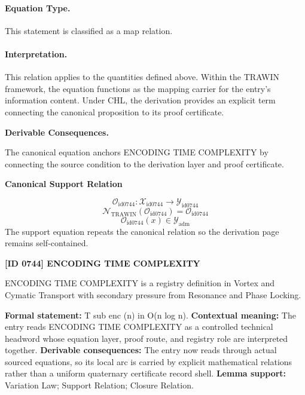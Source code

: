 \paragraph{Equation Type.}
This statement is classified as a map relation.

\paragraph{Interpretation.}
This relation applies to the quantities defined above. Within the TRAWIN framework, the equation functions as the mapping carrier for the entry’s information content. Under CHL, the derivation provides an explicit term connecting the canonical proposition to its proof certificate.

\par\vspace{0.35em}
\noindent\textbf{Derivable Consequences.}\quad
\begingroup
\footnotesize
\raggedright
The canonical equation anchors ENCODING TIME COMPLEXITY by connecting the source condition to the derivation layer and proof certificate.
\par\endgroup

\noindent\textbf{Canonical Support Relation}\par
\[
\mathcal{O}_{\mathrm{id0744}}:\mathcal{X}_{\mathrm{id0744}}\longrightarrow\mathcal{Y}_{\mathrm{id0744}}
\]
\[
\mathcal{N}_{\mathrm{TRAWIN}}(\mathcal{O}_{\mathrm{id0744}})=\mathcal{O}_{\mathrm{id0744}}
\]
\[
\mathcal{O}_{\mathrm{id0744}}(x)\in\mathcal{Y}_{\mathrm{adm}}
\]
\noindent The support equation repeats the canonical relation so the derivation page remains self-contained.\par

\clearpage
\noindent\textbf{[ID 0744] ENCODING TIME COMPLEXITY}\par
\vspace{0.35em}
\begingroup\small
{}
ENCODING TIME COMPLEXITY is a registry definition in Vortex and Cymatic Transport with secondary pressure from Resonance and Phase Locking.

\begingroup\footnotesize\setlength{\emergencystretch}{3em}\sloppy
\textbf{Formal statement:} T sub enc (n) in O(n log n). \textbf{Contextual meaning:} The entry reads ENCODING TIME COMPLEXITY as a controlled technical headword whose equation layer, proof route, and registry role are interpreted together. \textbf{Derivable consequences:} The entry now reads through actual sourced equations, so its local arc is carried by explicit mathematical relations rather than a uniform quaternary certificate record shell. \textbf{Lemma support:} Variation Law; Support Relation; Closure Relation.\par
\endgroup

